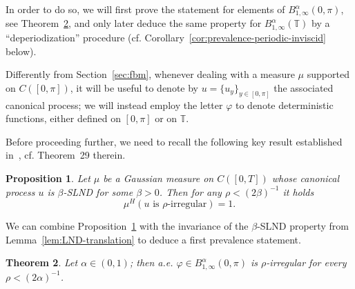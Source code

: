 \documentclass[11pt,oneside,reqno]{amsart}
\newtheorem{theorem}{Theorem}[section]
\newtheorem{proposition}[theorem]{Proposition}
{\theoremstyle{remark}\newtheorem{remark}[theorem]{Remark}}
\numberwithin{equation}{section}
\begin{document}
In order to do so, we will first prove the statement for elements of
$B^{\alpha}_{1, \infty} (0, \pi)$, see
Theorem~\ref{thm:prevalence-interval-inviscid}, and only later deduce the same
property for $B^{\alpha}_{1, \infty} (\mathbb{T})$ by a ``deperiodization''
procedure (cf. Corollary~\ref{cor:prevalence-periodic-inviscid} below).

Differently from Section~\ref{sec:fbm}, whenever dealing with a measure $\mu$
supported on $C ([0, \pi])$, it will be useful to denote by $u = \{ u_y \}_{y
\in [0, \pi]}$ the associated canonical process; we will instead employ the
letter $\varphi$ to denote deterministic functions, either defined on $[0,
\pi]$ or on $\mathbb{T}$.

Before proceeding further, we need to recall the following key result
established in~{\cite{galeati2020prevalence}}, cf. Theorem~29 therein.

\begin{proposition}
  \label{thm:prevalence-rho-irregularity}Let $\mu$ be a Gaussian measure on $C
  ([0, T])$ whose canonical process $u$ is $\beta$-SLND for some $\beta > 0$.
  Then for any $\rho < (2 \beta)^{- 1}$ it holds
  \[ \mu^H \left( u \text{ is } \rho \text{-irregular} \right) = 1. \]
\end{proposition}

We can combine Proposition~\ref{thm:prevalence-rho-irregularity} with the
invariance of the $\beta$-SLND property from Lemma~\ref{lem:LND-translation}
to deduce a first prevalence statement.

\begin{theorem}
  \label{thm:prevalence-interval-inviscid}Let $\alpha \in (0, 1)$; then a.e.
  $\varphi \in B^{\alpha}_{1, \infty} (0, \pi)$ is $\rho$-irregular for every
  $\rho < (2 \alpha)^{- 1}$.
\end{theorem}
\end{document}
